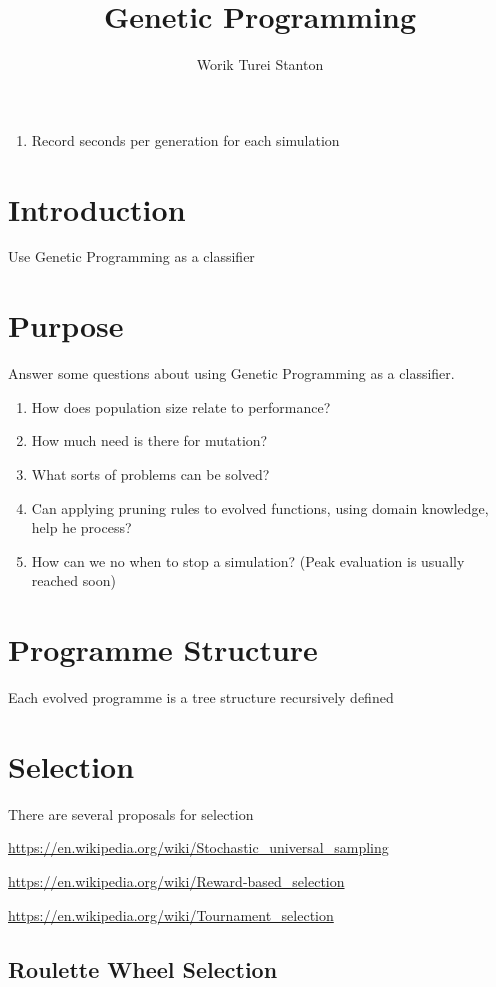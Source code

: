 \documentclass[a4paper,twoside]{article}
\title{Genetic Programming}
\author{Worik Turei Stanton}
\begin{document}
\begin{enumerate}
  \item Record seconds per generation for each simulation
\end{enumerate}

\section{Introduction}

Use Genetic Programming as a classifier



\section{Purpose}
Answer some questions about using Genetic Programming as a classifier.

\begin{enumerate}
\item How does population size relate to performance?
\item How much need is there for mutation?
\item What sorts of problems can be solved?
\item Can applying pruning rules to evolved functions, using domain
  knowledge, help he process?
\item How can we no when to stop a simulation? (Peak evaluation is
  usually reached soon)
\end{enumerate}

\section{Programme Structure}

Each evolved programme is a tree structure recursively defined 


\section{Selection}

There are several proposals for selection

\url{https://en.wikipedia.org/wiki/Stochastic_universal_sampling}

\url{https://en.wikipedia.org/wiki/Reward-based_selection}

\url{https://en.wikipedia.org/wiki/Tournament_selection}

\subsection{Roulette Wheel Selection}
\end{document}
